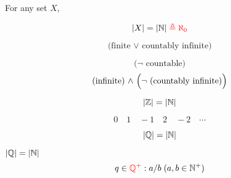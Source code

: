 \begin{frame}{}
  \begin{definition}[Infinite]
    For any set $X$,
    \begin{description}
      \item[Countably Infinite]
        \[
          |X| = |\mathbb{N}| \textcolor{red}{\;\triangleq \aleph_{0}}
        \]
      \item[Countable]
        \[
          \text{(finite $\lor$ countably infinite)}
        \]
      \item[Uncountable]
        \[
          \text{($\lnot$ countable)}
        \]
        \[
          \text{(infinite) $\land$ \Big($\lnot$ (countably infinite)\Big)}
        \]
    \end{description}
  \end{definition}
\end{frame}

\begin{frame}{}
\end{frame}

\begin{frame}{}
  \begin{theorem}[$\Z$ is Countable.]
    \[
      |\mathbb{Z}| = |\mathbb{N}|
    \]
  \end{theorem}


  \pause
  \[
    0 \quad 1 \quad -1 \quad 2 \quad -2 \quad \cdots
  \]
\end{frame}

\begin{frame}{}
  \begin{theorem}
    \[
      |\mathbb{Q}| = |\mathbb{N}|
    \]
  \end{theorem}

  \pause
  \begin{exampleblock}{$|\mathbb{Q}| = |\mathbb{N}|$}
    \[
      q \in \textcolor{red}{\mathbb{Q}^{+}}: a / b \; (a,b \in \mathbb{N}^{+})
    \]

    \pause
    \vspace{-0.30cm}
    \begin{columns}
    \end{columns}
  \end{exampleblock}
\end{frame}

